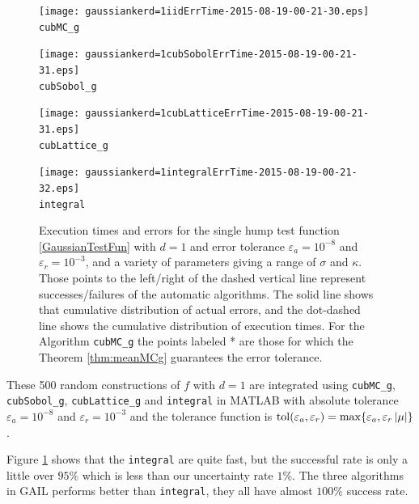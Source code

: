 \documentclass{iitthesis}
\theoremstyle{definition}
\begin{document}
\begin{figure}
\centering
\begin{minipage}{7cm} \centering \texttt{[image: gaussiankerd=1iidErrTime-2015-08-19-00-21-30.eps]} \\ {\tt cubMC\_g}  \end{minipage}
\begin{minipage}{7cm} \centering \texttt{[image: gaussiankerd=1cubSobolErrTime-2015-08-19-00-21-31.eps]} \\  {\tt cubSobol\_g}\end{minipage}
\begin{minipage}{7cm} \centering \texttt{[image: gaussiankerd=1cubLatticeErrTime-2015-08-19-00-21-31.eps]} \\ {\tt cubLattice\_g} \end{minipage}
\begin{minipage}{7cm} \centering \texttt{[image: gaussiankerd=1integralErrTime-2015-08-19-00-21-32.eps]} \\ {\tt integral } \end{minipage}
\caption{Execution times and errors for the single hump test function \eqref{GaussianTestFun} with $d=1$ and error tolerance $\varepsilon_a=10^{-8}$ and $\varepsilon_r=10^{-3}$, and a variety of parameters giving a range of $\sigma$ and $\kappa$. Those points to the left/right of the dashed vertical line represent successes/failures of the automatic algorithms.  The solid line shows that cumulative distribution of actual errors, and the dot-dashed line shows the cumulative distribution of execution times.  For the Algorithm {\tt cubMC\_g} the points labeled * are those for which the Theorem \ref{thm:meanMCg} guarantees the error tolerance.\label{fig:GaussiankerTestFun} }
\end{figure}

These 500 random constructions of $f$ with $d=1$ are integrated using  {\tt cubMC\_g}, {\tt cubSobol\_g}, {\tt cubLattice\_g} and {\tt integral} in MATLAB with absolute tolerance $\varepsilon_a = 10^{-8}$ and $\varepsilon_r=10^{-3}$ and the tolerance function is $\operatorname{tol}(\varepsilon_a, \varepsilon_r) = \max \{ \varepsilon_a, \varepsilon_r \left \lvert \mu \right \rvert\}$. 

Figure \ref{fig:GaussiankerTestFun} shows that the {\tt integral} are quite fast, but the successful rate is only a little over $95\%$ which is less than our uncertainty rate $1\%$. The three algorithms in GAIL performs better than {\tt integral}, they all have almost $100\%$ success rate.
\end{document}
